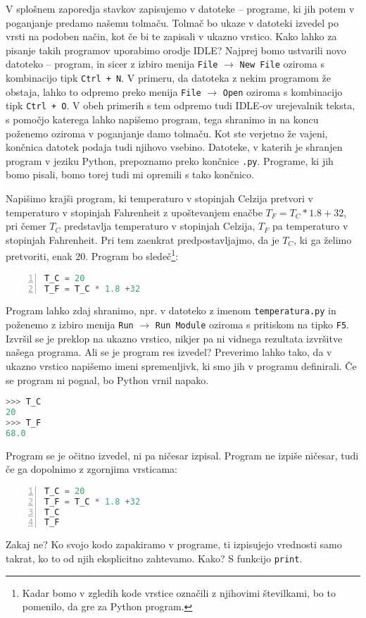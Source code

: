 V splošnem zaporedja stavkov zapisujemo v datoteke -- programe, ki jih potem v poganjanje predamo našemu tolmaču. Tolmač bo ukaze v datoteki izvedel po vrsti na podoben način, kot če bi te zapisali v ukazno vrstico. Kako lahko za pisanje takih programov uporabimo orodje IDLE? Najprej bomo ustvarili novo datoteko -- program, in sicer z izbiro menija \texttt{File} $\rightarrow$ \texttt{New File} oziroma s kombinacijo tipk \texttt{Ctrl + N}. V primeru, da datoteka z nekim programom že obstaja, lahko to odpremo preko menija \texttt{File} $\rightarrow$ \texttt{Open} oziroma s kombinacijo tipk \texttt{Ctrl + O}. V obeh primerih s tem odpremo tudi IDLE-ov urejevalnik teksta, s pomočjo katerega lahko napišemo program, tega shranimo in na koncu poženemo oziroma v poganjanje damo tolmaču. Kot ste verjetno že vajeni, končnica datotek podaja tudi njihovo vsebino. Datoteke, v katerih je shranjen program v jeziku Python, prepoznamo preko končnice \texttt{.py}. Programe, ki jih bomo pisali, bomo torej tudi mi opremili s tako končnico.

Napišimo krajši program, ki temperaturo v stopinjah Celzija pretvori v temperaturo v stopinjah Fahrenheit z upoštevanjem enačbe $T_F = T_C * 1.8 +32$, pri čemer $T_C$ predstavlja temperaturo v stopinjah Celzija, $T_F$ pa temperaturo v stopinjah Fahrenheit. Pri tem zaenkrat predpostavljajmo, da je $T_C$, ki ga želimo pretvoriti, enak 20. Program bo sledeč\footnote{Kadar bomo v zgledih kode vrstice označili z njihovimi številkami, bo to pomenilo, da gre za Python program.}:
\begin{lstlisting}[language=Python,numbers=left]
T_C = 20
T_F = T_C * 1.8 +32
\end{lstlisting}
Program lahko zdaj shranimo, npr. v datoteko z imenom \texttt{temperatura.py} in poženemo z izbiro menija \texttt{Run} $\rightarrow$ \texttt{Run Module} oziroma s pritiskom na tipko \texttt{F5}. Izvršil se je preklop na ukazno vrstico, nikjer pa ni vidnega rezultata izvršitve našega programa. Ali se je program res izvedel? Preverimo lahko tako, da v ukazno vrstico napišemo imeni spremenljivk, ki smo jih v programu definirali. Če se program ni pognal, bo Python vrnil napako.
\begin{lstlisting}[language=Python]
>>> T_C
20
>>> T_F
68.0
\end{lstlisting}
Program se je očitno izvedel, ni pa ničesar izpisal. Program ne izpiše ničesar, tudi če ga dopolnimo z zgornjima vrsticama:
\begin{lstlisting}[language=Python,numbers=left]
T_C = 20
T_F = T_C * 1.8 +32
T_C
T_F
\end{lstlisting}
Zakaj ne? Ko svojo kodo zapakiramo v programe, ti izpisujejo vrednosti samo takrat, ko to od njih eksplicitno zahtevamo. Kako? S funkcijo \texttt{print}.

